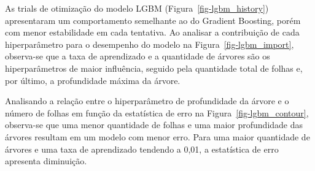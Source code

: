 \documentclass[
  12pt,
  a4paper,
]{scrreprt}
\begin{document}
\vspace{12pt}

As trials de otimização do modelo LGBM (Figura~\ref{fig-lgbm_history})
apresentaram um comportamento semelhante ao do Gradient Boosting, porém
com menor estabilidade em cada tentativa. Ao analisar a contribuição de
cada hiperparâmetro para o desempenho do modelo na
Figura~\ref{fig-lgbm_import}, observa-se que a taxa de aprendizado e a
quantidade de árvores são os hiperparâmetros de maior influência,
seguido pela quantidade total de folhas e, por último, a profundidade
máxima da árvore.

\vspace{12pt}

Analisando a relação entre o hiperparâmetro de profundidade da árvore e
o número de folhas em função da estatística de erro na
Figura~\ref{fig-lgbm_contour}, observa-se que uma menor quantidade de
folhas e uma maior profundidade das árvores resultam em um modelo com
menor erro. Para uma maior quantidade de árvores e uma taxa de
aprendizado tendendo a 0,01, a estatística de erro apresenta diminuição.
\end{document}
